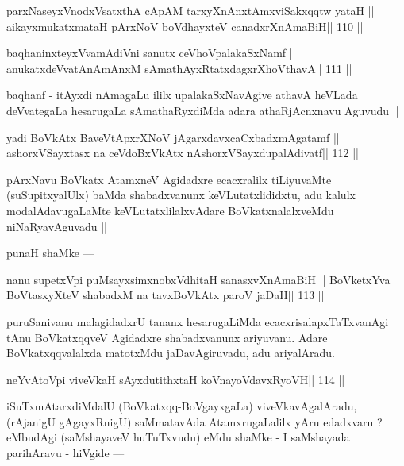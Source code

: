 \begin{shl}
parxNaseyxVnodxVsatxthA cApAM tarxyXnAnxtAmxviSakxqqtw yataH ||
aikayxmukatxmataH pArxNoV boVdhayxteV canadxrXnAmaBiH\hfill || 110 ||
\end{shl}

\begin{shl}
baqhaninxteyxVvamAdiVni sanutx ceVhoVpalakaSxNamf ||
anukatxdeVvatAnAmAnxM sAmathAyxRtatxdagxrXhoV\s thavA\hfill || 111 ||
\end{shl}

\begin{artha}
baqhanf - itAyxdi nAmagaLu ililx upalakaSxNavAgive athavA heVLada deVvategaLa hesarugaLa sAmathaRyxdiMda adara athaRjAcnxnavu Aguvudu ||
\end{artha}

\begin{shl}
yadi BoVkAtx BaveVtApxrXNoV jAgarxdavxcaCxbadxmAgatamf ||
ashorxVSayxtasx na ceVdoBxVkAtx nAshorxVSayxdupalAdivatf\hfill || 112 ||
\end{shl}

\begin{artha}
pArxNavu BoVkatx AtamxneV Agidadxre ecacxralilx tiLiyuvaMte (suSupitxyalUlx) baMda shabadxvanunx keVLutatxlididxtu, adu kalulx modalAdavugaLaMte keVLutatxlilalxvAdare BoVkatxnalalxveMdu niNaRyavAguvadu ||
\end{artha}

\begin{artha}
punaH shaMke ---
\end{artha}

\begin{shl}
nanu supetxV\s pi puMsayxsimxnobxVdhitaH sanasxvXnAmaBiH ||
BoVketxYva BoVtasxyXteV shabadxM na tavxBoVkAtx paroV jaDaH\hfill || 113 ||
\end{shl}

\begin{artha}
puruSanivanu malagidadxrU tananx hesarugaLiMda ecacxrisalapxTaTxvanAgi tAnu BoVkatxqqveV Agidadxre shabadxvanunx ariyuvanu. Adare BoVkatxqqvalalxda matotxMdu jaDavAgiruvadu, adu ariyalAradu.
\end{artha}

\begin{shl}
neYvAtoV\s pi viveVkaH sAyxdutithxtaH koV\s nayoVdavxRyoVH\hfill || 114 ||
\end{shl}

\begin{artha}
iSuTxmAtarxdiMdalU (BoVkatxqq-BoVgayxgaLa) viveVkavAgalAradu, (rAjanigU gAgayxRnigU) saMmatavAda AtamxrugaLalilx yAru edadxvaru ? eMbudAgi (saMshayaveV huTuTxvudu) eMdu shaMke - I saMshayada parihAravu - hiVgide ---
\end{artha}

